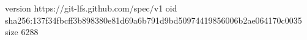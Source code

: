 version https://git-lfs.github.com/spec/v1
oid sha256:137f34fbcff3b898380e81d69a6b791d9bd50974419856006b2ae064170c0035
size 6288
